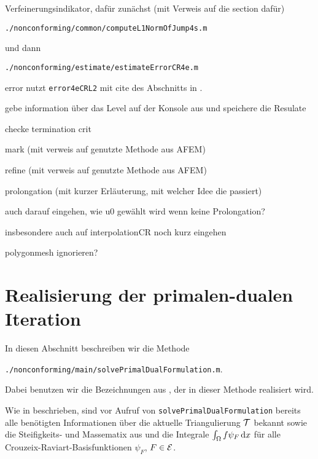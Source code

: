 \bigskip  Verfeinerungsindikator, dafür zunächst (mit Verweis auf die section
dafür)
\begin{center}
  \texttt{./nonconforming/common/computeL1NormOfJump4s.m}
\end{center}
und dann 
\begin{center}
  \texttt{./nonconforming/estimate/estimateErrorCR4e.m}
\end{center}

\bigskip error nutzt \texttt{error4eCRL2} mit cite des Abschnitts in
\cite{CGKNRR10}.

\bigskip gebe information über das Level auf der Konsole aus und
speichere die Resulate

\bigskip checke termination crit

\bigskip mark (mit verweis auf genutzte Methode aus AFEM)

\bigskip refine (mit verweis auf genutzte Methode aus AFEM)

\bigskip prolongation (mit kurzer Erläuterung, mit welcher Idee die passiert)

auch darauf eingehen, wie u0 gewählt wird wenn keine Prolongation?

insbesondere auch auf interpolationCR noch kurz eingehen

\bigskip polygonmesh ignorieren? 


\section{Realisierung der primalen-dualen Iteration}
\label{sec:implementationPrimalDualIteration}
In diesen Abschnitt beschreiben wir die Methode
\begin{center}
  \texttt{./nonconforming/main/solvePrimalDualFormulation.m}.
\end{center}
Dabei benutzen wir die Bezeichnungen aus , der
in dieser Methode realisiert wird.

Wie in  beschrieben, sind vor Aufruf von
\texttt{solvePrimalDualFormulation} bereits alle benötigten Informationen
über die aktuelle Triangulierung $\mathcal{T}$ bekannt sowie
die Steifigkeits- und Massematix aus  und
die Integrale $\int_\Omega f\psi_F\,\mathrm{d}x$ für alle
Crouzeix-Raviart-Basisfunktionen $\psi_F$, $F\in\mathcal{E}$.

